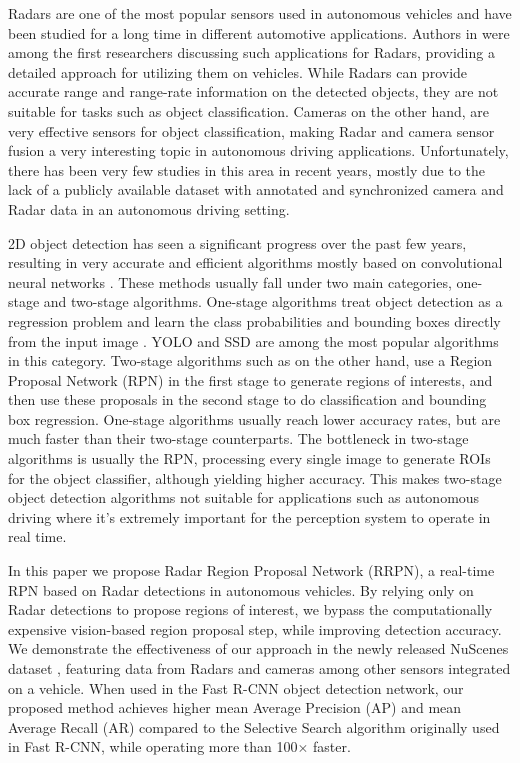 \documentclass{article}
\newcommand{\dataset}{NuScenes }
\begin{document}
Radars are one of the most popular sensors used in autonomous vehicles and have been 
studied for a long time in different automotive applications. Authors in 
\cite{Grimes1974} were among the first researchers 
discussing such applications for Radars, providing a detailed approach for utilizing them 
on vehicles. While Radars can provide accurate range and range-rate information on the 
detected objects, they are not suitable for tasks such as object classification. 
Cameras on the other hand, are very effective sensors 
for object classification, making Radar and camera sensor fusion a very 
interesting topic in autonomous driving applications. Unfortunately, there has been 
very few studies in this area in recent years, mostly due to the lack of a publicly available 
dataset with annotated and synchronized camera and Radar data in an autonomous driving 
setting.

2D object detection has seen a significant progress over the past few years, resulting in 
very accurate and efficient algorithms mostly based on convolutional neural networks 
\cite{Girshick2015,rfcn2016r,ren2015faster,liu2016ssd}. These methods usually fall under two 
main categories, one-stage and two-stage algorithms. One-stage algorithms treat object 
detection as a regression problem and learn the class probabilities and bounding boxes 
directly from the input image \cite{soviany2018optimizing}. YOLO \cite{redmon2016YOLO} and 
SSD \cite{liu2016ssd} are among the most popular algorithms in this category. Two-stage 
algorithms such as \cite{Girshick2015,ren2015faster} on the other hand, use a Region Proposal 
Network (RPN) in the first stage to generate regions of interests, and then use these 
proposals in the second stage to do classification and bounding box regression. 
One-stage algorithms usually reach lower accuracy rates, but are much faster than 
their two-stage counterparts. The bottleneck in two-stage 
algorithms is usually the RPN, processing every single image to generate ROIs for the object classifier, although yielding higher accuracy. This 
makes two-stage object detection algorithms not suitable for applications such as autonomous driving where 
it's extremely important for the perception system to operate in real time.

In this paper we propose Radar Region Proposal Network (RRPN), a real-time RPN based on Radar detections in autonomous 
vehicles. 
By relying only on Radar detections to propose regions of interest, we bypass the 
computationally expensive vision-based region proposal step, while improving detection 
accuracy. We demonstrate the effectiveness of our approach in the newly released 
\dataset dataset \cite{caesar2019nuscenes}, featuring data from Radars and cameras among 
other sensors integrated on a vehicle. When used in the Fast R-CNN object detection network, 
our proposed method achieves higher mean Average Precision (AP) and mean Average Recall 
(AR) compared to the Selective Search algorithm originally used in Fast R-CNN, while 
operating more than 100$\times$ faster.
\end{document}
